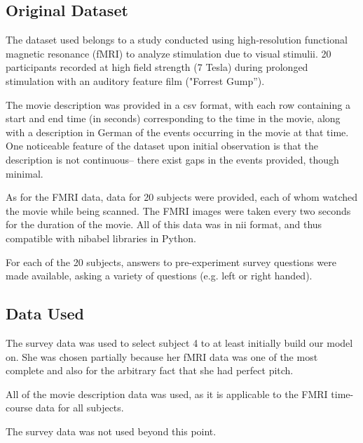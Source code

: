 \par \indent 

\subsection{Original Dataset}
\par The dataset used belongs to a study conducted using high-resolution functional magnetic resonance (fMRI) to analyze stimulation due to visual stimulii. 20 participants recorded at high field strength (7 Tesla) during prolonged stimulation with an auditory feature film ("Forrest Gump''). 

\par The movie description was provided in a csv format, with each row containing a 
start and end time (in seconds) corresponding to the time in the movie, along with
a description in German of the events occurring in the movie at that time. 
One noticeable feature of the dataset upon initial observation is that the description
is not continuous-- there exist gaps in the events provided, though minimal.

\par As for the FMRI data, data for 20 subjects were provided, each of whom watched
the movie while being scanned. The FMRI images were taken every two seconds for
the duration of the movie. All of this data was in nii format, and thus compatible
with nibabel libraries in Python.

\par For each of the 20 subjects, answers to pre-experiment survey questions were made available, asking a variety of questions (e.g. left or right handed). 


\subsection{Data Used}
\par The survey data was used to select subject 4 to at least initially build our
model on. She was chosen partially because her fMRI data was one of the most complete
and also for the arbitrary fact that she had perfect pitch.

\par All of the movie description data was used, as it is applicable to the FMRI time-course data for all subjects. 

\par The survey data was not used beyond this point.